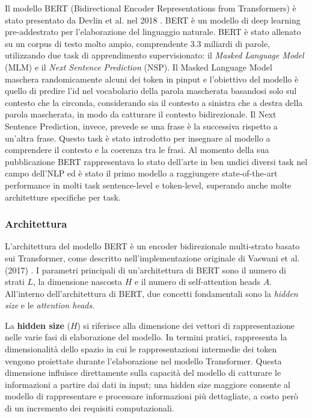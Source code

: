 \documentclass[../../Thesis.tex]{subfiles}
\begin{document}
Il modello BERT (Bidirectional Encoder Representations from Transformers) è stato presentato da Devlin et al. nel 2018 \cite{BERT}. BERT è un modello di deep learning pre-addestrato per l'elaborazione del linguaggio naturale. BERT è stato allenato su un corpus di testo molto ampio, comprendente 3.3 miliardi di parole, utilizzando due task di apprendimento supervisionato: il \emph{Masked Language Model} (MLM) e il \emph{Next Sentence Prediction} (NSP). Il Masked Language Model maschera randomicamente alcuni dei token in pinput e l'obiettivo del modello è quello di predire l'id nel vocabolario della parola mascherata basandosi solo sul contesto che la circonda, considerando sia il contesto a sinistra che a destra della parola mascherata, in modo da catturare il contesto bidirezionale. Il Next Sentence Prediction, invece, prevede se una frase è la successiva rispetto a un'altra frase. Questo task è stato introdotto per insegnare al modello a comprendere il contesto e la coerenza tra le frasi. Al momento della sua pubblicazione BERT rappresentava lo stato dell'arte in ben undici diversi task nel campo dell'NLP ed è stato il primo modello a raggiungere state-of-the-art performance in molti task sentence-level e token-level, superando anche molte architetture specifiche per task. 

\subsubsection{Architettura}
L'architettura del modello BERT è un encoder bidirezionale multi-strato basato sui Transformer, come descritto nell'implementazione originale di Vaswani et al. (2017) \cite{AttentionIsAllYouNeed}. I parametri principali di un'architettura di BERT sono il numero di strati $L$, la dimensione nascosta $H$ e il numero di self-attention heads $A$. All'interno dell'architettura di BERT, due concetti fondamentali sono la \textit{hidden size} e le \textit{attention heads}.

La \textbf{hidden size} ($H$) si riferisce alla dimensione dei vettori di rappresentazione nelle varie fasi di elaborazione del modello. In termini pratici, rappresenta la dimensionalità dello spazio in cui le rappresentazioni intermedie dei token vengono proiettate durante l'elaborazione nel modello Transformer. Questa dimensione influisce direttamente sulla capacità del modello di catturare le informazioni a partire dai dati in input; una hidden size maggiore consente al modello di rappresentare e processare informazioni più dettagliate, a costo però di un incremento dei requisiti computazionali.
\end{document}
